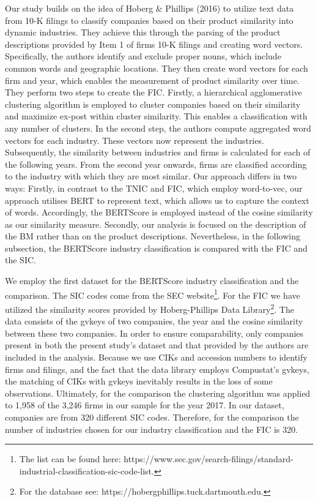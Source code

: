 \documentclass[
]{article}
\begin{document}
Our study builds on the idea of Hoberg \& Phillips (2016) to utilize
text data from 10-K filings to classify companies based on their product
similarity into dynamic industries. They achieve this through the
parsing of the product descriptions provided by Item 1 of firms 10-K
filings and creating word vectors. Specifically, the authors identify
and exclude proper nouns, which include common words and geographic
locations. They then create word vectors for each firm and year, which
enables the measurement of product similarity over time. They perform
two steps to create the FIC. Firstly, a hierarchical agglomerative
clustering algorithm is employed to cluster companies based on their
similarity and maximize ex-post within cluster similarity. This enables
a classification with any number of clusters. In the second step, the
authors compute aggregated word vectors for each industry. These vectors
now represent the industries. Subsequently, the similarity between
industries and firms is calculated for each of the following years. From
the second year onwards, firms are classified according to the industry
with which they are most similar. Our approach differs in two ways:
Firstly, in contrast to the TNIC and FIC, which employ word-to-vec, our
approach utilises BERT to represent text, which allows us to capture the
context of words. Accordingly, the BERTScore is employed instead of the
cosine similarity as our similarity measure. Secondly, our analysis is
focused on the description of the BM rather than on the product
descriptions. Nevertheless, in the following subsection, the BERTScore
industry classification is compared with the FIC and the SIC.

We employ the first dataset for the BERTScore industry classification
and the comparison. The SIC codes come from the SEC website\footnote{The
  list can be found here:
  https://www.sec.gov/search-filings/standard-industrial-classification-sic-code-list.}.
For the FIC we have utilized the similarity scores provided by
Hoberg-Phillips Data Library\footnote{For the database see:
  https://hobergphillips.tuck.dartmouth.edu.}. The data consists of the
gvkeys of two companies, the year and the cosine similarity between
these two companies. In order to ensure comparability, only companies
present in both the present study's dataset and that provided by the
authors are included in the analysis. Because we use CIKs and accession
numbers to identify firms and filings, and the fact that the data
library employs Compustat's gvkeys, the matching of CIKs with gvkeys
inevitably results in the loss of some observations. Ultimately, for the
comparison the clustering algorithm was applied to 1,958 of the 3,246
firms in our sample for the year 2017. In our dataset, companies are
from 320 different SIC codes. Therefore, for the comparison the number
of industries chosen for our industry classification and the FIC is 320.
\end{document}
